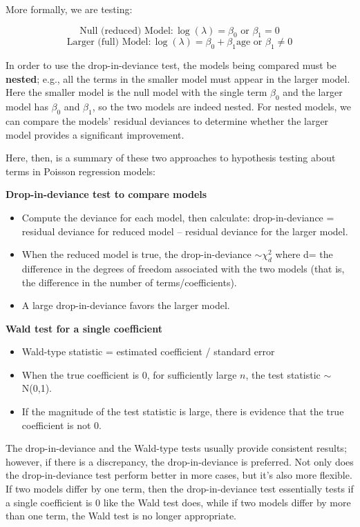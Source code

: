 \documentclass[
]{krantz}
\providecommand{\tightlist}{%
  \setlength{\itemsep}{0pt}\setlength{\parskip}{0pt}}
\begin{document}
More formally, we are testing:

\[\textrm{Null (reduced) Model}: \log(\lambda) = \beta_0 \textrm{ or } \beta_1=0\]
\[\textrm{Larger (full) Model}: \log(\lambda) = \beta_0 + \beta_1\textrm{age} \textrm{ or } \beta_1 \neq 0 \]

In order to use the drop-in-deviance test, the models being compared must be \textbf{nested};  e.g., all the terms in the smaller model must appear in the larger model. Here the smaller model is the null model with the single term \(\beta_0\) and the larger model has \(\beta_0\) and \(\beta_1\), so the two models are indeed nested. For nested models, we can compare the models' residual deviances to determine whether the larger model provides a significant improvement.

Here, then, is a summary of these two approaches to hypothesis testing about terms in Poisson regression models:

\textbf{Drop-in-deviance test to compare models} 

\begin{itemize}
\tightlist
\item
  Compute the deviance for each model, then calculate: drop-in-deviance = residual deviance for reduced model -- residual deviance for the larger model.
\item
  When the reduced model is true, the drop-in-deviance \(\sim \chi^2_d\)
  where d= the difference in the degrees of freedom associated with the two models (that is, the difference in the number of terms/coefficients).
\item
  A large drop-in-deviance favors the larger model.
\end{itemize}

\textbf{Wald test for a single coefficient} 

\begin{itemize}
\tightlist
\item
  Wald-type statistic = estimated coefficient / standard error
\item
  When the true coefficient is 0, for sufficiently large \(n\), the test statistic \(\sim\) N(0,1).
\item
  If the magnitude of the test statistic is large, there is evidence that the true coefficient is not 0.
\end{itemize}

The drop-in-deviance and the Wald-type tests usually provide consistent results; however, if there is a discrepancy, the drop-in-deviance is preferred. Not only does the drop-in-deviance test perform better in more cases, but it's also more flexible. If two models differ by one term, then the drop-in-deviance test essentially tests if a single coefficient is 0 like the Wald test does, while if two models differ by more than one term, the Wald test is no longer appropriate.
\end{document}
